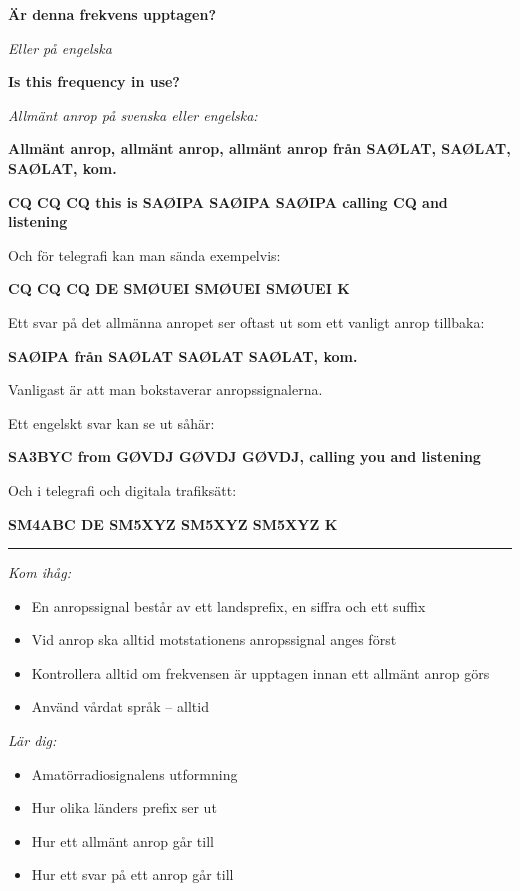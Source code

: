 \textbf{Är denna frekvens upptagen?}

\textit{Eller på engelska}

\textbf{Is this frequency in use?}
  
\textit{Allmänt anrop på svenska eller engelska:}

\textbf{Allmänt anrop, allmänt anrop, allmänt anrop från SAØLAT,
  SAØLAT, SAØLAT, kom.}

\textbf{CQ CQ CQ this is SAØIPA SAØIPA SAØIPA calling CQ and
  listening}

Och för telegrafi kan man sända exempelvis:

\textbf{CQ CQ CQ DE SMØUEI SMØUEI SMØUEI K}

Ett svar på det allmänna anropet ser oftast ut som ett vanligt anrop
tillbaka:

\textbf{SAØIPA från SAØLAT SAØLAT SAØLAT, kom.}

Vanligast är att man bokstaverar anropssignalerna.

Ett engelskt svar kan se ut såhär:

\textbf{SA3BYC from GØVDJ GØVDJ GØVDJ, calling you and listening}

Och i telegrafi och digitala trafiksätt:

\textbf{SM4ABC DE SM5XYZ SM5XYZ SM5XYZ K}

\vspace{1em} \hrule \vspace{1em}

\emph{Kom ihåg:}

\begin{itemize}
  \item En anropssignal består av ett landsprefix, en siffra och ett
    suffix
  \item Vid anrop ska alltid motstationens anropssignal anges först

  \item Kontrollera alltid om frekvensen är upptagen innan ett
    allmänt anrop görs
    
  \item Använd vårdat språk -- alltid
\end{itemize}

\emph{Lär dig:}

\begin{itemize}
\item Amatörradiosignalens utformning
\item Hur olika länders prefix ser ut
\item Hur ett allmänt anrop går till
\item Hur ett svar på ett anrop går till
\end{itemize}

